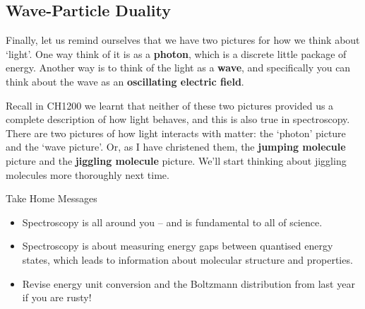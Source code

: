 \subsection{Wave-Particle Duality}
Finally, let us remind ourselves that we have two pictures for how we think about `light'. One way think of it is as a \textbf{photon}, which is a discrete little package of energy. Another way is to think of the light as a \textbf{wave}, and specifically you can think about the wave as an \textbf{oscillating electric field}.

Recall in CH1200 we learnt that neither of these two pictures provided us a complete description of how light behaves, and this is also true in spectroscopy. There are two pictures of how light interacts with matter: the `photon' picture and the `wave picture'. Or, as I have christened them, the \textbf{jumping molecule} picture and the \textbf{jiggling molecule} picture. We'll start thinking about jiggling molecules more thoroughly next time.

\begin{conclusion}{Take Home Messages}
\begin{itemize}
\item Spectroscopy is all around you -- and is fundamental to all of science. 
\item Spectroscopy is about measuring energy gaps between quantised energy states, which leads to information about molecular structure and properties.
\item Revise energy unit conversion and the Boltzmann distribution from last year if you are rusty!
\end{itemize}
\end{conclusion}



